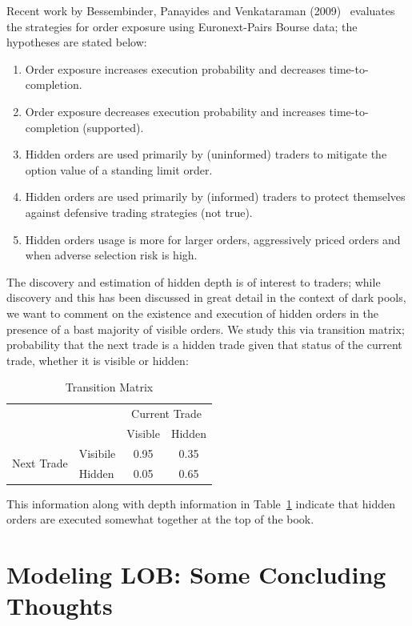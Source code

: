 Recent work by Bessembinder, Panayides and Venkataraman (2009)~\cite{bessenbinder} evaluates the strategies for order exposure using Euronext-Pairs Bourse data; the hypotheses are stated below:
	\begin{enumerate}[--]
	\item Order exposure increases execution probability and decreases time-to-completion.
	\item Order exposure decreases execution probability and increases time-to-completion (supported).
	\item Hidden orders are used primarily by (uninformed) traders to mitigate the option value of a standing limit order.
	\item Hidden orders are used primarily by (informed) traders to protect themselves against defensive trading strategies (not true).
	\item Hidden orders usage is more for larger orders, aggressively priced orders and when adverse selection risk is high.
	\end{enumerate}
The discovery and estimation of hidden depth is of interest to traders; while discovery and this has been discussed in great detail in the context of dark pools, we want to comment on the existence and execution of hidden orders in the presence of a bast majority of visible orders. We study this via transition matrix; probability that the next trade is a hidden trade given that status of the current trade, whether it is visible or hidden:
	\begin{table}[!ht]
	\centering
	\caption{Transition Matrix \label{tab:transmatrix}}
	\begin{tabular}{c l | cc}
	& & \multicolumn{2}{c}{Current Trade} \\
	& & Visible & Hidden \\ \hline
	\multirow{2}{*}{Next Trade} & Visibile & 0.95 & 0.35 \\
	& Hidden & 0.05 & 0.65
	\end{tabular}
	\end{table}
This information along with depth information in Table~\ref{tab:transmatrix} indicate that hidden orders are executed somewhat together at the top of the book. 



\section{Modeling LOB: Some Concluding Thoughts}

